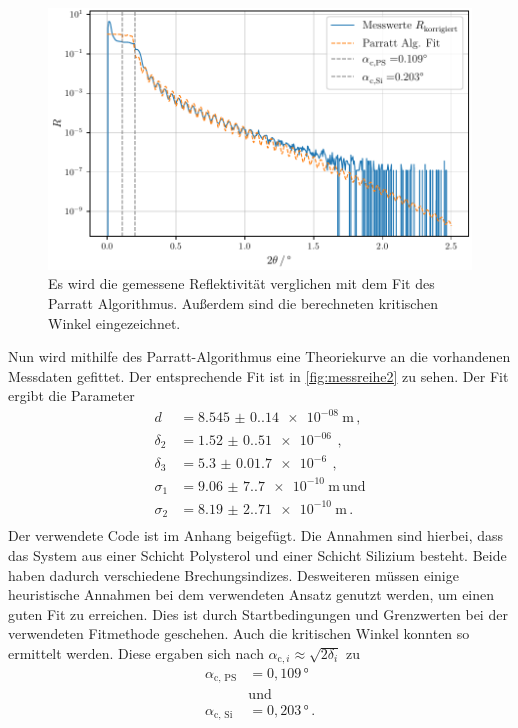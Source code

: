 \begin{figure}
    \centering
    \includegraphics[width = 0.8 \linewidth]{build/messung2.pdf}
    \caption{Es wird die gemessene Reflektivität verglichen mit dem Fit des Parratt Algorithmus.
    Außerdem sind die berechneten kritischen Winkel eingezeichnet.}
    \label{fig:messreihe2}
\end{figure}

Nun wird mithilfe des Parratt-Algorithmus eine Theoriekurve an die vorhandenen Messdaten gefittet.
Der entsprechende Fit ist in \autoref{fig:messreihe2} zu sehen.
Der Fit ergibt die Parameter
\begin{align*}
    d & = \qty{8.545(0.14)e-08}{\unit\meter} \, , \\
    \delta_2 & = \qty{1.52(0.51)e-06}{} \, , \\
    \delta_3 & = \qty{5.3(0.017)e-6}{} \, , \\
    \sigma_1 & = \qty{9.06(7.7)e-10}{\unit\meter} \, \text{und} \\
    \sigma_2 & = \qty{8.19(2.71)e-10}{\unit\meter} \, . \\
\end{align*}
Der verwendete Code ist im Anhang beigefügt.
Die Annahmen sind hierbei, dass das System aus einer Schicht Polysterol und einer Schicht Silizium besteht.
Beide haben dadurch verschiedene Brechungsindizes.
Desweiteren müssen einige heuristische Annahmen bei dem verwendeten Ansatz genutzt werden, um einen guten Fit zu erreichen.
Dies ist durch Startbedingungen und Grenzwerten bei der verwendeten Fitmethode geschehen.
Auch die kritischen Winkel konnten so ermittelt werden.
Diese ergaben sich nach $\alpha_{\text{c}, i} \approx \sqrt{2 \delta_i}$ zu
\begin{align*}
    \alpha_{\text{c, PS}} &= 0{,}109 \, ° \\
    &\text{und} \\
    \alpha_{\text{c, Si}} &= 0{,}203 \, ° \, .
\end{align*}